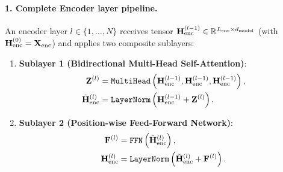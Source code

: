 \documentclass[../../main.tex]{subfiles}
\begin{document}
\paragraph{1. Complete Encoder layer pipeline.}
An encoder layer $l \in \{1, \dots, N\}$ receives tensor $\mathbf{H}_{\text{enc}}^{(l-1)} \in \mathbb{R}^{L_{\text{enc}} \times d_{\text{model}}}$ (with $\mathbf{H}_{\text{enc}}^{(0)} = \mathbf{X}_{\text{enc}}$) and applies two composite sublayers:
\begin{enumerate}
    \item \textbf{Sublayer 1 (Bidirectional Multi-Head Self-Attention)}:
    \begin{align}
    \label{eq:enc_sublayer1_attn}
    \mathbf{Z}^{(l)} &= \text{\texttt{MultiHead}}\left(\mathbf{H}_{\text{enc}}^{(l-1)}, \mathbf{H}_{\text{enc}}^{(l-1)}, \mathbf{H}_{\text{enc}}^{(l-1)}\right), \\
    \label{eq:enc_sublayer1_norm}
    \tilde{\mathbf{H}}_{\text{enc}}^{(l)} &= \text{\texttt{LayerNorm}}\left(\mathbf{H}_{\text{enc}}^{(l-1)} + \mathbf{Z}^{(l)}\right).
    \end{align}
    \item \textbf{Sublayer 2 (Position-wise Feed-Forward Network)}:
    \begin{align}
    \label{eq:enc_sublayer2_ffn}
    \mathbf{F}^{(l)} &= \text{\texttt{FFN}}\left(\tilde{\mathbf{H}}_{\text{enc}}^{(l)}\right), \\
    \label{eq:enc_sublayer2_norm}
    \mathbf{H}_{\text{enc}}^{(l)} &= \text{\texttt{LayerNorm}}\left(\tilde{\mathbf{H}}_{\text{enc}}^{(l)} + \mathbf{F}^{(l)}\right).
    \end{align}
\end{enumerate}
\end{document}
